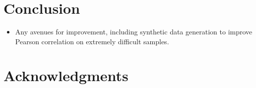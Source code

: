 \documentclass[11pt,a4paper]{article}
\begin{document}
\section{Conclusion}
\begin{itemize}
  \item Any avenues for improvement, including synthetic data generation to improve Pearson correlation on extremely difficult samples.
\end{itemize}

\section*{Acknowledgments}




\end{document}
